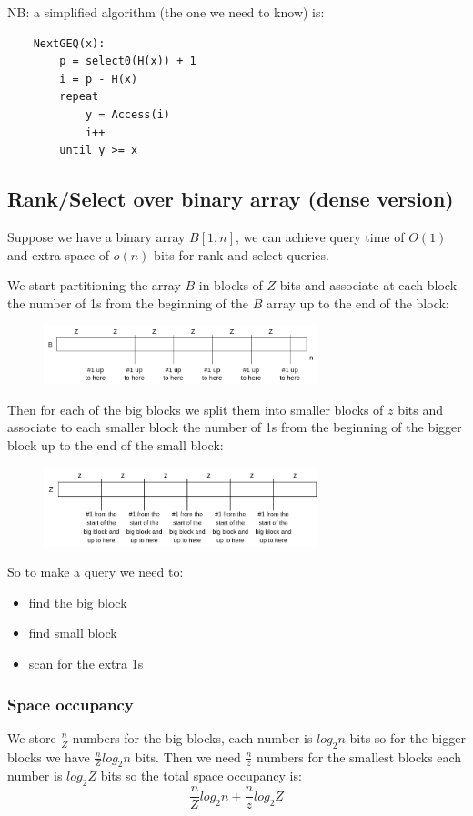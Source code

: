 NB: a simplified algorithm (the one we need to know) is:
\begin{verbatim}
    NextGEQ(x):
        p = select0(H(x)) + 1
        i = p - H(x)
        repeat 
            y = Access(i)
            i++
        until y >= x
\end{verbatim}

\subsection{Rank/Select over binary array (dense version)}
Suppose we have a binary array $B[1,n]$, we can achieve query time of $O(1)$ and extra space of $o(n)$ bits for rank and select queries.

We start partitioning the array $B$ in blocks of $Z$ bits and associate at each block the number of 1s from the beginning of the $B$ array up to the end of the block:
\begin{figure}[H]
    \centering
    \includegraphics[width=300px]{images/10_Data_compression/rank_select_big_partitions.png}
\end{figure}
Then for each of the big blocks we split them into smaller blocks of $z$ bits and associate to each smaller block the number of 1s from the beginning of the bigger block up to the end of the small block:
\begin{figure}[H]
    \centering
    \includegraphics[width=300px]{images/10_Data_compression/rank_select_small_partitions.png}
\end{figure}

So to make a query we need to:
\begin{itemize}
    \item find the big block
    \item find small block
    \item scan for the extra 1s
\end{itemize}

\subsubsection{Space occupancy}
We store $\frac{n}{Z}$ numbers for the big blocks, each number is $log_2 n$ bits so for the bigger blocks we have $\frac{n}{Z} log_2 n$ bits.
Then we need $\frac{n}{z}$ numbers for the smallest blocks each number is $log_2 Z$ bits so the total space occupancy is:
$$
\frac{n}{Z}log_2 n + \frac{n}{z} log_2 Z
$$

